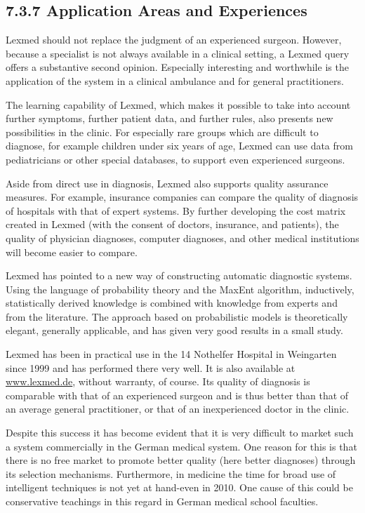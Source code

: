\documentclass[10pt]{article}
\begin{document}
\subsection*{7.3.7 Application Areas and Experiences}
Lexmed should not replace the judgment of an experienced surgeon. However, because a specialist is not always available in a clinical setting, a Lexmed query offers a substantive second opinion. Especially interesting and worthwhile is the application of the system in a clinical ambulance and for general practitioners.

The learning capability of Lexmed, which makes it possible to take into account further symptoms, further patient data, and further rules, also presents new possibilities in the clinic. For especially rare groups which are difficult to diagnose, for example children under six years of age, Lexmed can use data from pediatricians or other special databases, to support even experienced surgeons.

Aside from direct use in diagnosis, Lexmed also supports quality assurance measures. For example, insurance companies can compare the quality of diagnosis of hospitals with that of expert systems. By further developing the cost matrix created in Lexmed (with the consent of doctors, insurance, and patients), the quality of physician diagnoses, computer diagnoses, and other medical institutions will become easier to compare.

Lexmed has pointed to a new way of constructing automatic diagnostic systems. Using the language of probability theory and the MaxEnt algorithm, inductively,\\
statistically derived knowledge is combined with knowledge from experts and from the literature. The approach based on probabilistic models is theoretically elegant, generally applicable, and has given very good results in a small study.

Lexmed has been in practical use in the 14 Nothelfer Hospital in Weingarten since 1999 and has performed there very well. It is also available at \href{http://www.lexmed.de}{www.lexmed.de}, without warranty, of course. Its quality of diagnosis is comparable with that of an experienced surgeon and is thus better than that of an average general practitioner, or that of an inexperienced doctor in the clinic.

Despite this success it has become evident that it is very difficult to market such a system commercially in the German medical system. One reason for this is that there is no free market to promote better quality (here better diagnoses) through its selection mechanisms. Furthermore, in medicine the time for broad use of intelligent techniques is not yet at hand-even in 2010. One cause of this could be conservative teachings in this regard in German medical school faculties.
\end{document}
